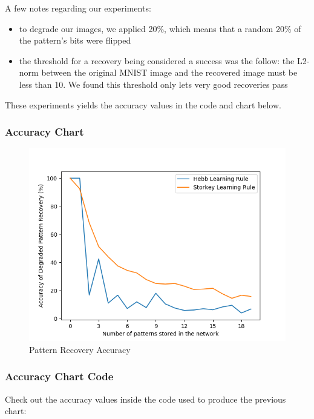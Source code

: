 \documentclass[11pt]{article}
\begin{document}
\pagebreak

A few notes regarding our experiments:

\begin{itemize}
\item
  to degrade our images, we applied 20\%, which means that a random 20\%
  of the pattern's bits were flipped
\item
  the threshold for a recovery being considered a success was the
  follow: the L2-norm between the original MNIST image and the recovered
  image must be less than 10. We found this threshold only lets very
  good recoveries pass
\end{itemize}

These experiments yields the accuracy values in the code and chart
below.

\subsubsection{Accuracy Chart}\label{accuracy-chart}

\begin{figure}[htbp]
	\centering
	\includegraphics[scale=1.15]{../figures/q1/accuracy.png}
	\caption{Pattern Recovery Accuracy}
\end{figure}

\pagebreak

\subsubsection{Accuracy Chart Code}

Check out the accuracy values inside the code used to produce the previous chart:
\end{document}
